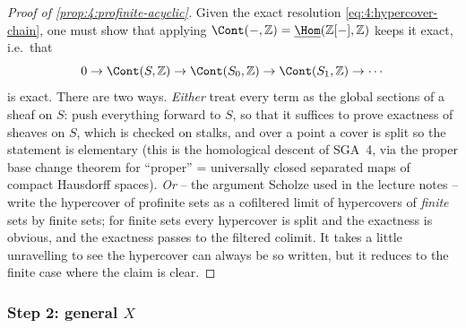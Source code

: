 \begin{proof}[Proof of \cref{prop:4:profinite-acyclic}]
Given the exact resolution \eqref{eq:4:hypercover-chain}, one must show that
applying $\Cont(-,\mathbb{Z})=\underline{\Hom}(\mathbb{Z}[-],\mathbb{Z})$
keeps it exact, i.e.\ that
\begin{equation*}
0\to\Cont(S,\mathbb{Z})\to\Cont(S_0,\mathbb{Z})\to\Cont(S_1,\mathbb{Z})\to\cdots
\end{equation*}
is exact. There are two ways. \emph{Either} treat every term as the global
sections of a sheaf on $S$: push everything forward to $S$, so that it suffices
to prove exactness of sheaves on $S$, which is checked on stalks, and over a
point a cover is split so the statement is elementary (this is the homological
descent of SGA~4, via the proper base change theorem for ``proper'' = universally
closed separated maps of compact Hausdorff spaces). \emph{Or} -- the argument
Scholze used in the lecture notes -- write the hypercover of profinite sets as a
cofiltered limit of hypercovers of \emph{finite} sets by finite sets; for finite
sets every hypercover is split and the exactness is obvious, and the exactness
passes to the filtered colimit. It takes a little unravelling to see the
hypercover can always be so written, but it reduces to the finite case where the
claim is clear.
\end{proof}

\subsubsection*{Step 2: general \texorpdfstring{$X$}{X}}

